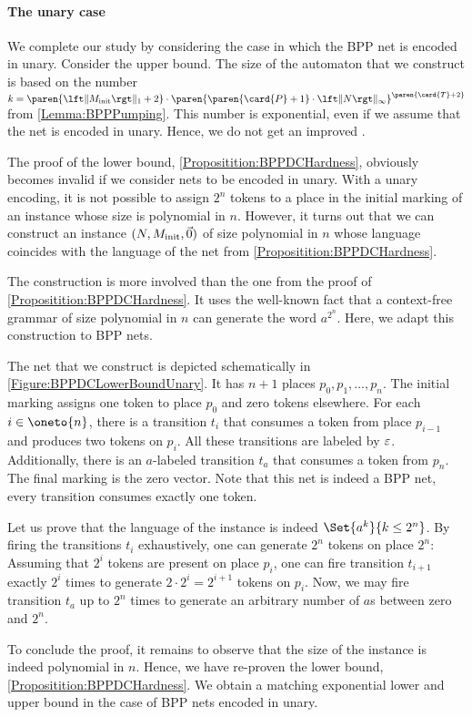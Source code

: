 \documentclass[../../diss.tex]{subfiles}
\begin{document}
\paragraph{The unary case}

We complete our study by considering the case in which the BPP net is encoded in unary.
Consider the upper bound.
The size of the automaton that we construct is based on the number $k = \paren{\normone{\Minit}+2} \cdot \paren{ \paren{\card{P}+1} \cdot \norminf{N}}^{ \paren{\card{T} + 2} }$ from \cref{Lemma:BPPPumping}.
This number is exponential, even if we assume that the net is encoded in unary.
Hence, we do not get an improved .

The proof of the lower bound, \cref{Propositition:BPPDCHardness}, obviously becomes invalid if we consider nets to be encoded in unary.
With a unary encoding, it is not possible to assign $2^n$ tokens to a place in the initial marking of an instance whose size is polynomial in $n$.
However, it turns out that we can construct an instance $(N,M_{\text{init}},\vec{0})$ of size polynomial in $n$ whose language coincides with the language of the net from \cref{Propositition:BPPDCHardness}.

The construction is more involved than the one from the proof of \cref{Propositition:BPPDCHardness}.
It uses the well-known fact that a context-free grammar of size polynomial in $n$ can generate the word $a^{2^n}$.
Here, we adapt this construction to BPP nets.

The net that we construct is depicted schematically in \cref{Figure:BPPDCLowerBoundUnary}.
It has $n+1$ places $p_0, p_1, \ldots, p_n$.
The initial marking assigns one token to place $p_0$ and zero tokens elsewhere.
For each $i \in \oneto{n}$, there is a transition $t_i$ that consumes a token from place $p_{i-1}$ and produces two tokens on $p_i$.
All these transitions are labeled by $\varepsilon$.
Additionally, there is an $a$-labeled transition $t_a$ that consumes a token from $p_n$.
The final marking is the zero vector.
Note that this net is indeed a BPP net, every transition consumes exactly one token.

Let us prove that the language of the instance is indeed $\Set{ a^k }{ k \leq 2^n}$.
By firing the transitions $t_i$ exhaustively, one can generate $2^n$ tokens on place $2^n$: Assuming that $2^{i}$ tokens are present on place $p_i$, one can fire transition $t_{i+1}$ exactly $2^{i}$ times to generate $2 \cdot 2^{i} = 2^{i+1}$ tokens on $p_i$.
Now, we may fire transition $t_a$ up to $2^n$ times to generate an arbitrary number of $a$s between zero and $2^n$.

To conclude the proof, it remains to observe that the size of the instance is indeed polynomial in $n$.
Hence, we have re-proven the lower bound, \cref{Propositition:BPPDCHardness}.
We obtain a matching exponential lower and upper bound in the case of BPP nets encoded in unary.
\end{document}
